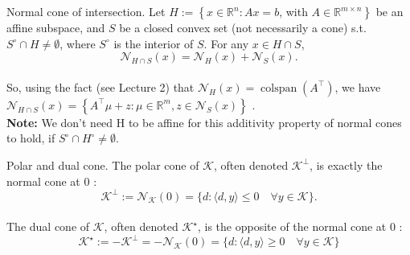 \begin{theorem}[L9.1]{Normal cone of intersection.}
    Let $H:=\left\{x \in \mathbb{R}^n: A x=b\right.$, with $\left.A \in \mathbb{R}^{m \times n}\right\}$ be an affine subspace, and $S$ be a closed convex set (not necessarily a cone) s.t. $S^{\circ} \cap H \neq \emptyset$, where $S^{\circ}$ is the interior of $S$. For any $x \in H \cap S$,
    \vspace{-4pt}\\
    $$
    \mathcal{N}_{H \cap S}(x)=\mathcal{N}_H(x)+\mathcal{N}_S(x) .
    $$
    \vspace{-5pt}\\
    So, using the fact (see Lecture 2) that $\mathcal{N}_H(x)=\operatorname{colspan}\left(A^{\top}\right)$, we have
    $\mathcal{N}_{H \cap S}(x)=\left\{A^{\top} \mu+z: \mu \in \mathbb{R}^m, z \in \mathcal{N}_S(x)\right\}$ .
    \\
    \textbf{Note:} We don't need H to be affine for this additivity property of normal cones to hold, if $S^\circ \cap H^\circ \neq \emptyset$.
\end{theorem}

\begin{remark}[L9.1]{Polar and dual cone.}
    The polar cone of $\mathcal{K}$, often denoted $\mathcal{K}^{\perp}$, is exactly the normal cone at 0 :
    \vspace{-4pt}\\
    $$
    \mathcal{K}^{\perp}:=\mathcal{N}_{\mathcal{K}}(0)=\{d:\langle d, y\rangle \leq 0 \quad \forall y \in \mathcal{K}\} .
    $$
    \vspace{-7pt}\\
    The dual cone of $\mathcal{K}$, often denoted $\mathcal{K}^{\star}$, is the opposite of the normal cone at 0 :
    \vspace{-4pt}\\
    $$
    \mathcal{K}^{\star}:=-\mathcal{K}^{\perp}=-\mathcal{N}_{\mathcal{K}}(0)=\{d:\langle d, y\rangle \geq 0 \quad \forall y \in \mathcal{K}\}
    $$
    \vspace{-7pt}
\end{remark}

